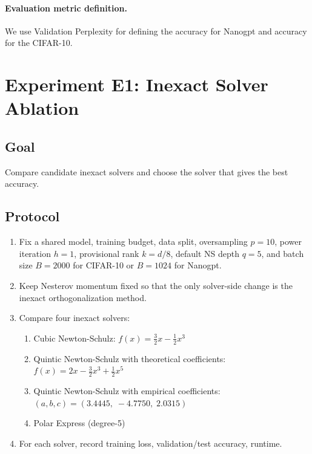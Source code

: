 \documentclass[11pt]{article}
\begin{document}
\paragraph{Evaluation metric definition.} We use Validation Perplexity for defining the accuracy for Nanogpt and accuracy for the CIFAR-10.


\section{Experiment E1: Inexact Solver Ablation}

\subsection{Goal}

Compare candidate inexact solvers and choose the solver that gives the best accuracy.

\subsection{Protocol}

\begin{enumerate}[nosep]
\item Fix a shared model, training budget, data split, oversampling $p=10$, power iteration $h=1$, provisional rank $k = d/8$, default NS depth $q=5$, and batch size $B=2000$ for CIFAR-10 or $B=1024$ for Nanogpt.
\item Keep Nesterov momentum fixed so that the only solver-side change is the inexact orthogonalization method.
\item Compare four inexact solvers:
\begin{enumerate}[nosep]
    \item Cubic Newton-Schulz: $f(x) = \tfrac{3}{2}x - \tfrac{1}{2}x^3$
    \item Quintic Newton-Schulz with theoretical coefficients: $f(x) = 2x - \tfrac{3}{2}x^3 + \tfrac{1}{2}x^5$
    \item Quintic Newton-Schulz with empirical coefficients: $(a,b,c) = (3.4445,\; -4.7750,\; 2.0315)$
    \item Polar Express (degree-5)
\end{enumerate}
\item For each solver, record training loss, validation/test accuracy, runtime.
\end{enumerate}
\end{document}
